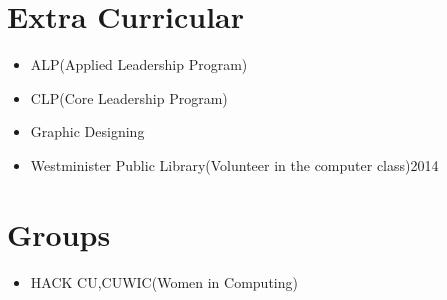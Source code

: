 \documentclass[10pt,a4paper,sans]{moderncv} %
\begin{document}
\section{Extra Curricular}
\begin{itemize}
\item{}{ALP(Applied Leadership Program)}
\item{}{CLP(Core Leadership Program)}
\item{}{Graphic Designing}
\item{}{Westminister Public Library(Volunteer in the computer class){2014}}
\end{itemize}

\section{Groups}
\begin{itemize}
\item {}{HACK CU,CUWIC(Women in Computing)}
\end{itemize}

\end{document}
